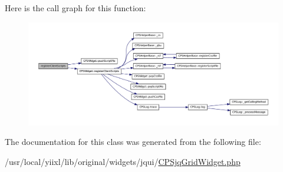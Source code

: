 Here is the call graph for this function:\nopagebreak
\begin{figure}[H]
\begin{center}
\leavevmode
\includegraphics[width=400pt]{classCPSjqGridWidget_ac02a66bde8e72e4909137bf748edf665_cgraph}
\end{center}
\end{figure}




The documentation for this class was generated from the following file:\begin{DoxyCompactItemize}
\item 
/usr/local/yiixl/lib/original/widgets/jqui/\hyperlink{CPSjqGridWidget_8php}{CPSjqGridWidget.php}\end{DoxyCompactItemize}
